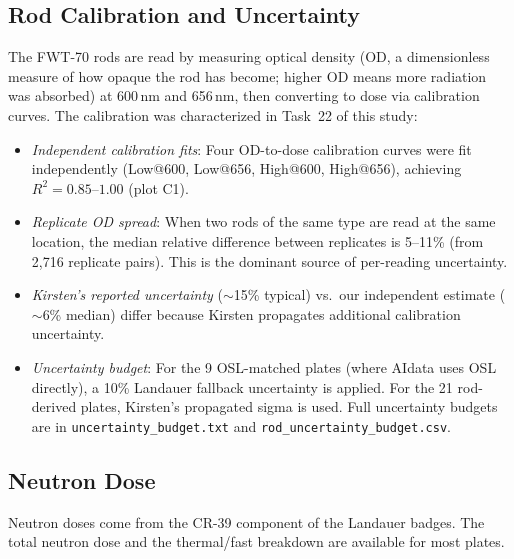 \documentclass[11pt,letterpaper]{article}
\begin{document}
\subsection{Rod Calibration and Uncertainty}
\label{sec:rod_calibration}

The FWT-70 rods are read by measuring optical density (OD, a dimensionless
measure of how opaque the rod has become; higher OD means more radiation
was absorbed) at 600\,nm and 656\,nm, then converting to dose via calibration
curves. The calibration was
characterized in Task~22 of this study:

\begin{itemize}
    \item \emph{Independent calibration fits}: Four OD-to-dose calibration
    curves were fit independently (Low@600, Low@656, High@600, High@656),
    achieving $R^2 = 0.85$--$1.00$ (plot C1).

    \item \emph{Replicate OD spread}: When two rods of the same type are
    read at the same location, the median relative difference between replicates
    is 5--11\% (from 2,716 replicate pairs). This is the dominant source of
    per-reading uncertainty.

    \item \emph{Kirsten's reported uncertainty} ($\sim$15\% typical) vs.\
    our independent estimate ($\sim$6\% median) differ because Kirsten
    propagates additional calibration uncertainty.

    \item \emph{Uncertainty budget}: For the 9 OSL-matched plates (where
    AIdata uses OSL directly), a 10\% Landauer fallback uncertainty is applied.
    For the 21 rod-derived plates, Kirsten's propagated sigma is used. Full
    uncertainty budgets are in \texttt{uncertainty\_budget.txt} and
    \texttt{rod\_uncertainty\_budget.csv}.
\end{itemize}

\subsection{Neutron Dose}

Neutron doses come from the CR-39 component of the Landauer badges. The total
neutron dose and the thermal/fast breakdown are available for most plates.
\end{document}
